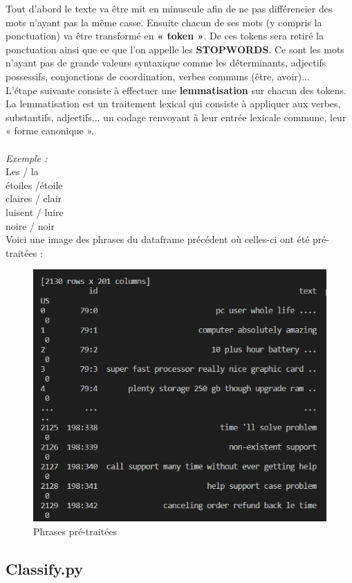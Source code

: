 \documentclass[12pt ,a4paper ]{article}
\begin{document}
\begin{multicols}{2}
\noindent Tout d'abord le texte va être mit en minuscule afin de ne pas différencier des mots n'ayant pas la même casse. Ensuite chacun de ses mots (y compris la ponctuation) va être transformé en \textbf{« token »}. De ces tokens sera retiré la ponctuation ainsi que ce que l'on appelle les \textbf{STOPWORDS}. Ce sont les mots n'ayant pas de grande valeurs syntaxique comme les déterminants, adjectifs possessifs, conjonctions de coordination, verbes communs (être, avoir)...\\

\noindent L'étape suivante consiste à effectuer une \textbf{lemmatisation} sur chacun des tokens. La lemmatisation est un traitement lexical qui consiste à appliquer aux verbes, substantifs, adjectifs... un codage renvoyant à leur entrée lexicale commune, leur « forme canonique ».\\\\

\noindent \textit{Exemple :}\\
Les / la\\
étoiles /étoile\\
claires / clair\\
luisent / luire\\
noire / noir\\

\noindent Voici une image des phrases du dataframe précédent où celles-ci ont été pré-traitées : 
\begin{figure}[H]
    \begin{center}
        \includegraphics[scale=0.62]{pretrait_dataf.png}
    \end{center}
\caption{\small{Phrases pré-traitées}}
\end{figure}

\subsection{Classify.py}

\end{multicols}
\end{document}
